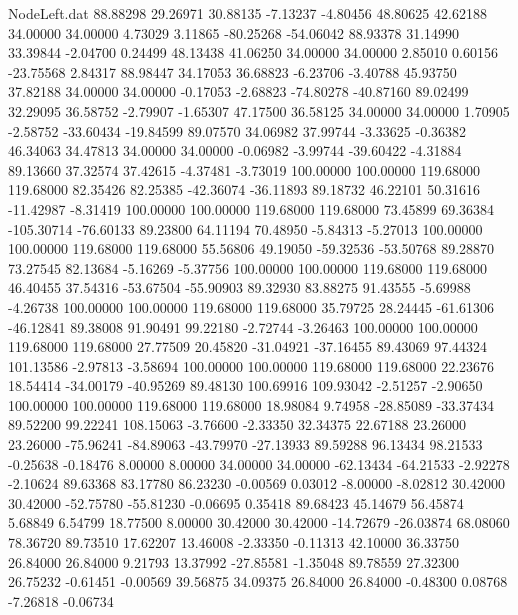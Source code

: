 \begin{filecontents}{NodeLeft.dat}
  88.88298   29.26971   30.88135    -7.13237   -4.80456   48.80625   42.62188   34.00000   34.00000    4.73029    3.11865  -80.25268  -54.06042
  88.93378   31.14990   33.39844    -2.04700    0.24499   48.13438   41.06250   34.00000   34.00000    2.85010    0.60156  -23.75568    2.84317
  88.98447   34.17053   36.68823    -6.23706   -3.40788   45.93750   37.82188   34.00000   34.00000   -0.17053   -2.68823  -74.80278  -40.87160
  89.02499   32.29095   36.58752    -2.79907   -1.65307   47.17500   36.58125   34.00000   34.00000    1.70905   -2.58752  -33.60434  -19.84599
  89.07570   34.06982   37.99744    -3.33625   -0.36382   46.34063   34.47813   34.00000   34.00000   -0.06982   -3.99744  -39.60422   -4.31884
  89.13660   37.32574   37.42615    -4.37481   -3.73019  100.00000  100.00000  119.68000  119.68000   82.35426   82.25385  -42.36074  -36.11893
  89.18732   46.22101   50.31616   -11.42987   -8.31419  100.00000  100.00000  119.68000  119.68000   73.45899   69.36384 -105.30714  -76.60133
  89.23800   64.11194   70.48950    -5.84313   -5.27013  100.00000  100.00000  119.68000  119.68000   55.56806   49.19050  -59.32536  -53.50768
  89.28870   73.27545   82.13684    -5.16269   -5.37756  100.00000  100.00000  119.68000  119.68000   46.40455   37.54316  -53.67504  -55.90903
  89.32930   83.88275   91.43555    -5.69988   -4.26738  100.00000  100.00000  119.68000  119.68000   35.79725   28.24445  -61.61306  -46.12841
  89.38008   91.90491   99.22180    -2.72744   -3.26463  100.00000  100.00000  119.68000  119.68000   27.77509   20.45820  -31.04921  -37.16455
  89.43069   97.44324  101.13586    -2.97813   -3.58694  100.00000  100.00000  119.68000  119.68000   22.23676   18.54414  -34.00179  -40.95269
  89.48130  100.69916  109.93042    -2.51257   -2.90650  100.00000  100.00000  119.68000  119.68000   18.98084    9.74958  -28.85089  -33.37434
  89.52200   99.22241  108.15063    -3.76600   -2.33350   32.34375   22.67188   23.26000   23.26000  -75.96241  -84.89063  -43.79970  -27.13933
  89.59288   96.13434   98.21533    -0.25638   -0.18476    8.00000    8.00000   34.00000   34.00000  -62.13434  -64.21533   -2.92278   -2.10624
  89.63368   83.17780   86.23230    -0.00569    0.03012   -8.00000   -8.02812   30.42000   30.42000  -52.75780  -55.81230   -0.06695    0.35418
  89.68423   45.14679   56.45874     5.68849    6.54799   18.77500    8.00000   30.42000   30.42000  -14.72679  -26.03874   68.08060   78.36720
  89.73510   17.62207   13.46008    -2.33350   -0.11313   42.10000   36.33750   26.84000   26.84000    9.21793   13.37992  -27.85581   -1.35048
  89.78559   27.32300   26.75232    -0.61451   -0.00569   39.56875   34.09375   26.84000   26.84000   -0.48300    0.08768   -7.26818   -0.06734

\end{filecontents}
